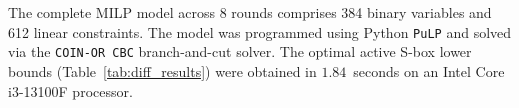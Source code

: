 \documentclass[10pt,twocolumn]{article}
\begin{document}
The complete MILP model across 8 rounds comprises 384 binary variables and 612 linear constraints. The model was programmed using Python \texttt{PuLP} and solved via the \texttt{COIN-OR CBC} branch-and-cut solver. The optimal active S-box lower bounds (Table~\ref{tab:diff_results}) were obtained in $1.84$~seconds on an Intel Core i3-13100F processor.

\begin{table}[htbp]
\caption{Active S-box lower bound scan (differential cryptanalysis)}
\label{tab:diff_results}
\centering
{}
\end{table}
\end{document}
